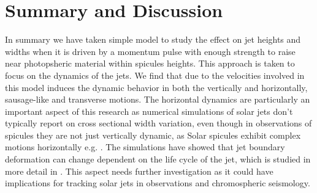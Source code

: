 \documentclass[12pt]{ociamthesis}
\newcommand{\eref}[1]{Eq. \eqref{#1}}
\begin{document}
\section{Summary and Discussion}
\label{sec:c2discussion}
In summary we have taken simple model to study the effect on jet heights and widths when it is driven by a momentum pulse with enough strength to raise near photopsheric material within spicules heights. This approach is taken to focus on the dynamics of the jets. We find that due to the velocities involved in this model induces the dynamic behavior in both the vertically and horizontally, sausage-like and transverse motions. The horizontal dynamics are particularly an important aspect of this research as numerical simulations of solar jets don't typically report on cross sectional width variation, even though in observations of spicules they are not just vertically dynamic, as Solar spicules exhibit complex motions horizontally e.g. \citep{Sharma2018ApJ85361S,Antolin2018ApJ85644A}. The simulations have showed that jet boundary deformation can change dependent on the life cycle of the jet, which is studied in more detail in \citep{Mackenzie_Dover_2020}. This aspect needs further investigation as it could have implications for tracking solar jets in observations and chromospheric seismology.    
\end{document}

